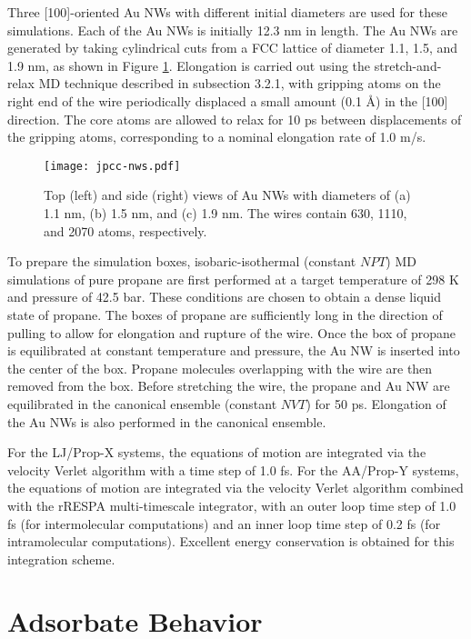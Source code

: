 \documentclass[10pt]{report}  %
\newcommand\findent{\hspace*{\parindent}}
\begin{document}
\findent Three [100]-oriented Au NWs with different initial diameters are used for these simulations.  Each of the Au NWs is initially 12.3 nm in length.  The Au NWs are generated by taking cylindrical cuts from a FCC lattice of diameter 1.1, 1.5, and 1.9 nm, as shown in Figure \ref{fig:jpcc-nws}. Elongation is carried out using the stretch-and-relax MD technique described in subsection 3.2.1, with gripping atoms on the right end of the wire periodically displaced a small amount (0.1 \AA) in the [100] direction. The core atoms are allowed to relax for 10 ps between displacements of the gripping atoms, corresponding to a nominal elongation rate of 1.0 m/s.

%
%
\begin{figure}[b]
	\centering
	\texttt{[image: jpcc-nws.pdf]}
	\caption{Top (left) and side (right) views of Au NWs with diameters of (a) 1.1 nm, (b) 1.5 nm, and (c) 1.9 nm.  The wires contain 630, 1110, and 2070 atoms, respectively.}
	\label{fig:jpcc-nws}
\end{figure}

To prepare the simulation boxes, isobaric-isothermal (constant $NPT$) MD simulations of pure propane are first performed at a target temperature of 298 K and pressure of 42.5 bar.  These conditions are chosen to obtain a dense liquid state of propane.  The boxes of propane are sufficiently long in the direction of pulling to allow for elongation and rupture of the wire.  Once the box of propane is equilibrated at constant temperature and pressure, the Au NW is inserted into the center of the box. Propane molecules overlapping with the wire are then removed from the box.  Before stretching the wire, the propane and Au NW are equilibrated in the canonical ensemble (constant $NVT$) for 50 ps.  Elongation of the Au NWs is also performed in the canonical ensemble.       

For the LJ/Prop-X systems, the equations of motion are integrated via the velocity Verlet algorithm with a time step of 1.0 fs.  For the AA/Prop-Y systems, the equations of motion are integrated via the velocity Verlet algorithm combined with the rRESPA multi-timescale integrator, with an outer loop time step of 1.0 fs (for intermolecular computations) and an inner loop time step of 0.2 fs (for intramolecular computations).  Excellent energy conservation is obtained for this integration scheme.

\section{Adsorbate Behavior}
\end{document}
